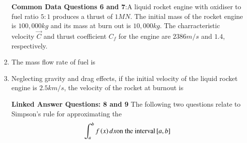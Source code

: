 \documentclass[journal,12pt,onecolumn]{IEEEtran}
\theoremstyle{remark}
\begin{document}
\begin{enumerate}
\textbf{Common Data Questions 6 and 7}:A liquid rocket engine with oxidiser to fuel ratio $5:1$ produces a thrust of $1 MN$. The initial mass of the rocket engine is $ 100,000 kg$ and its mass at burn out is $ 10,000kg $. The charracteristic velocity $\vec{C}$ and thrust coefficient $C_{f}$ for the engine are $2386 m/s$  and $1.4$, respectively.

\item The mass flow rate of fuel is 
\begin{enumerate}
\end{enumerate}

\item Neglecting gravity and drag effects, if the initial velocity of the liquid rocket engine is $2.5 km/s $, the velocity of the rocket at burnout is
\begin{enumerate}
\end{enumerate}

\textbf{Linked Answer Questions: 8 and 9}
The following two questions relate to Simpson's rule for approximating the \begin{align}
\int_{a}^{b} f\left(x\right) dx \text{on the interval} {}\left[a, b\right]
\end{align}


\end{enumerate}
\end{document}
